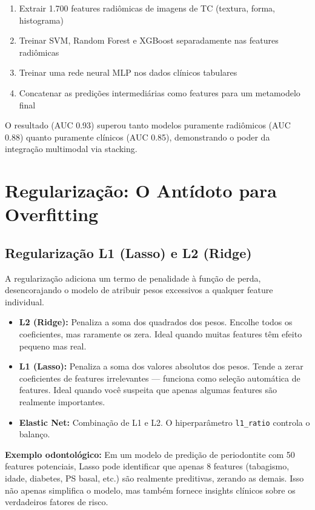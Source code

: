 \begin{enumerate}
    \item Extrair 1.700 features radiômicas de imagens de TC (textura, forma, histograma)
    \item Treinar SVM, Random Forest e XGBoost separadamente nas features radiômicas
    \item Treinar uma rede neural MLP nos dados clínicos tabulares
    \item Concatenar as predições intermediárias como features para um metamodelo final
\end{enumerate}

O resultado (AUC 0.93) superou tanto modelos puramente radiômicos (AUC 0.88) quanto puramente clínicos (AUC 0.85), demonstrando o poder da integração multimodal via stacking.

\section{Regularização: O Antídoto para Overfitting}

\subsection{Regularização L1 (Lasso) e L2 (Ridge)}

A regularização  adiciona um termo de penalidade à função de perda, desencorajando o modelo de atribuir pesos excessivos a qualquer feature individual.

\begin{itemize}
    \item \textbf{L2 (Ridge):} Penaliza a soma dos quadrados dos pesos. Encolhe todos os coeficientes, mas raramente os zera. Ideal quando muitas features têm efeito pequeno mas real.
    \item \textbf{L1 (Lasso):} Penaliza a soma dos valores absolutos dos pesos. Tende a zerar coeficientes de features irrelevantes — funciona como seleção automática de features. Ideal quando você suspeita que apenas algumas features são realmente importantes.
    \item \textbf{Elastic Net:} Combinação de L1 e L2. O hiperparâmetro \texttt{l1\_ratio} controla o balanço.
\end{itemize}

\textbf{Exemplo odontológico:} Em um modelo de predição de periodontite com 50 features potenciais, Lasso pode identificar que apenas 8 features (tabagismo, idade, diabetes, PS basal, etc.) são realmente preditivas, zerando as demais. Isso não apenas simplifica o modelo, mas também fornece insights clínicos sobre os verdadeiros fatores de risco.


